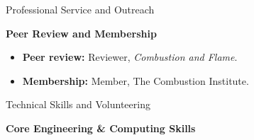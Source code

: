 \documentclass[11pt,a4paper]{article}
\begin{document}
\begin{sectionbanner}{Professional Service and Outreach}
\end{sectionbanner}
\noindent\textbf{Peer Review and Membership}
\begin{itemize}
\item \textbf{Peer review:} Reviewer, \emph{Combustion and Flame}.
\item \textbf{Membership:} Member, The Combustion Institute.
\end{itemize}


\begin{sectionbanner}{Technical Skills and Volunteering}
\end{sectionbanner}
\noindent\textbf{Core Engineering \& Computing Skills}\vspace*{4pt}
\end{document}
